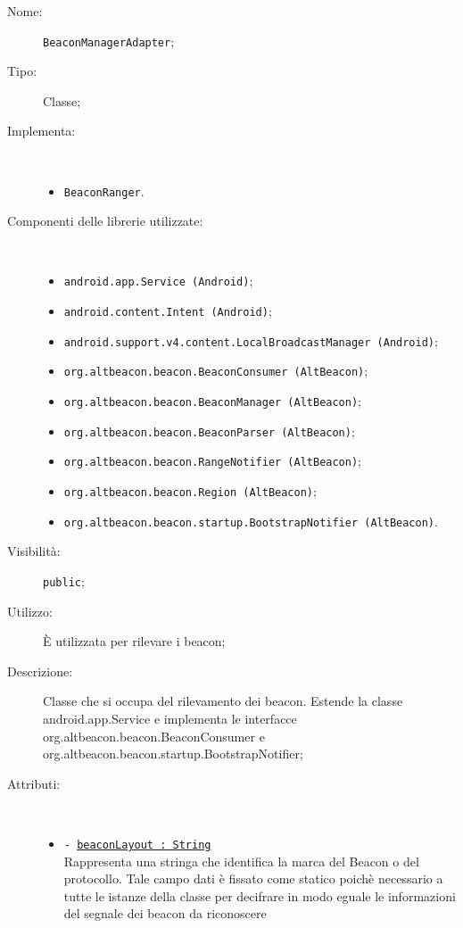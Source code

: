 \documentclass[../DefinizioneDiProdotto.tex]{subfiles}
\begin{document}
\begin{description}
	\item[Nome:] \texttt{BeaconManagerAdapter};
	\item[Tipo:] Classe;
	\item[Implementa:] \
	\begin{itemize}
		\item \texttt{BeaconRanger}.
		
	\end{itemize}
	\item[Componenti delle librerie utilizzate:] \
	\begin{itemize}
		\item \texttt{android.app.Service (Android)};
		
		\item \texttt{android.content.Intent (Android)};
		
		\item \texttt{android.support.v4.content.LocalBroadcastManager (Android)};
		
		\item \texttt{org.altbeacon.beacon.BeaconConsumer (AltBeacon)};
		
		\item \texttt{org.altbeacon.beacon.BeaconManager (AltBeacon)};
		
		\item \texttt{org.altbeacon.beacon.BeaconParser (AltBeacon)};
		
		\item \texttt{org.altbeacon.beacon.RangeNotifier (AltBeacon)};
		
		\item \texttt{org.altbeacon.beacon.Region (AltBeacon)};
		
		\item \texttt{org.altbeacon.beacon.startup.BootstrapNotifier (AltBeacon)}.
		
	\end{itemize}
	\item[Visibilità:] \texttt{public};
	\item[Utilizzo:] È utilizzata per rilevare i beacon;
	\item[Descrizione:] Classe che si occupa del rilevamento dei beacon. Estende la classe android.app.Service e implementa le interfacce org.altbeacon.beacon.\-BeaconConsumer e org.altbeacon.beacon.startup.BootstrapNotifier;
	\item[Attributi:] \
	\begin{itemize}
		\item \texttt{- \underline{beaconLayout : String}}\\
		Rappresenta una stringa che identifica la marca del Beacon o del protocollo. Tale campo dati è fissato come statico poichè necessario a tutte le istanze della classe per decifrare in modo eguale le informazioni del segnale dei beacon da riconoscere
		

\end{itemize}
\end{description}
\end{document}
